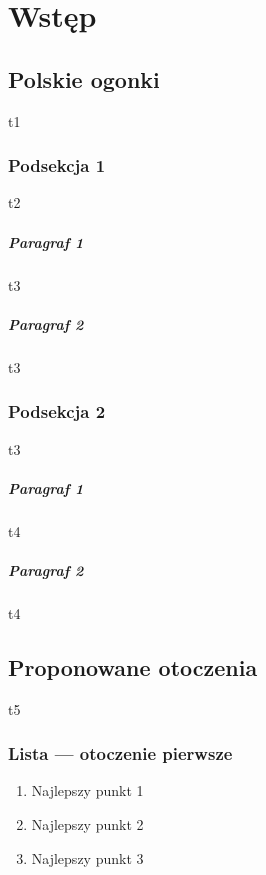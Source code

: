 \documentclass [a4paper, fleqn, 12pt] {mwrep}
\begin{document}
\maketitle
{}
\newpage
\tableofcontents

\newpage











\chapter{Wstęp}
\thispagestyle{empty}
\section {Polskie ogonki}
 {t1}
	\subsection {Podsekcja 1}
	 {t2}
		\paragraph {Paragraf 1}
		 {t3}
		\paragraph {Paragraf 2}
		 {t3}
	\subsection {Podsekcja 2}
	 {t3}
		\paragraph {Paragraf 1}
		 {t4}
		\paragraph {Paragraf 2}
		 {t4}


\section {Proponowane otoczenia}
 {t5}
	\subsection {Lista --- otoczenie pierwsze}
		\begin {enumerate}
			\item {Najlepszy punkt 1}
			\item {Najlepszy punkt 2}
			\item {Najlepszy punkt 3}
		\end {enumerate}
\end{document}
